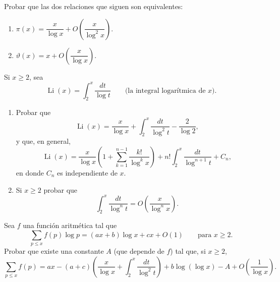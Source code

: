 \documentclass[12pt,a4paper]{book}
\begin{document}
    \begin{ejercicio}
        Probar que las dos relaciones que siguen son equivalentes:
        \begin{enumerate}
            \item[(a)] $\pi(x)=\dfrac{x}{\log x}+O\left(\dfrac{x}{\log^{2}x}\right)$.
            \item[(b)] $\vartheta(x)=x+O\left(\dfrac{x}{\log x}\right)$.
        \end{enumerate}
    \end{ejercicio}

    \begin{ejercicio}
        Si $x\geq2$, sea
        \begin{equation*}
            \operatorname{Li}(x)=\int_{2}^{x}\frac{dt}{\log t}\qquad\text{(la integral logarítmica de } x\text{).}
        \end{equation*}
        \begin{enumerate}
            \item[(a)] Probar que
            \begin{equation*}
                \operatorname{Li}(x)=\frac{x}{\log x}+\int_{2}^{x}\frac{dt}{\log^{2}t}-\frac{2}{\log2},
            \end{equation*}
            y que, en general,
            \begin{equation*}
                \operatorname{Li}(x)=\frac{x}{\log x}\left(1+\sum_{k=1}^{n-1}\frac{k!}{\log^{k}x}\right)
                +n!\int_{2}^{x}\frac{dt}{\log^{n+1}t}+C_{n},
            \end{equation*}
            en donde $C_{n}$ es independiente de $x$.
            \item[(b)] Si $x\geq2$ probar que
            \begin{equation*}
                \int_{2}^{x}\frac{dt}{\log^{n}t}=O\left(\frac{x}{\log^{n}x}\right).
            \end{equation*}
        \end{enumerate}
    \end{ejercicio}

    \begin{ejercicio}
        Sea $f$ una función aritmética tal que
        \begin{equation*}
            \sum_{p\leq x}f(p)\log p=(ax+b)\log x+cx+O(1)\qquad\text{para } x\geq2.
        \end{equation*}
        Probar que existe una constante $A$ (que depende de $f$) tal que, si $x\geq2$,
        \begin{equation*}
            \sum_{p\leq x}f(p)=ax-(a+c)\left(\frac{x}{\log x}+\int_{2}^{x}\frac{dt}{\log^{2}t}\right)
            +b\log(\log x)-A+O\left(\frac{1}{\log x}\right).
        \end{equation*}
    \end{ejercicio}
\end{document}
